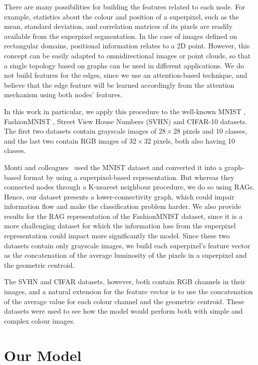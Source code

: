 \documentclass[twocolumn]{article}
\begin{document}
There are many possibilities for building the features related to each node. For example, statistics about the colour and position of a superpixel, such as the mean, standard deviation, and correlation matrices of its pixels are readily available from the superpixel segmentation. In the case of images defined on rectangular domains, positional information relates to a 2D point. However, this concept can be easily adapted to  omnidirectional images or point clouds, so that a single topology based on graphs can be used in different applications. We do not build features for the edges, since we use an attention-based technique, and believe that the edge feature will be learned accordingly from the attention mechanism using both nodes' features.

In this work in particular, we apply this procedure to the well-known MNIST \cite{lecun1998mnist}, FashionMNIST \cite{xiao2017fashionmnist}, Street View House Numbers (SVHN) \cite{netzer2011svhn} and CIFAR-10 \cite{krizhevsky2009cifar} datasets. The first two datasets contain grayscale images of $28 \times 28$ pixels and 10 classes, and the last two contain RGB images of $32 \times 32$ pixels, both also having 10 classes.

Monti and colleagues~\cite{monti2017monet} used the MNIST dataset and converted it into a graph-based format by using a superpixel-based representation. But whereas they connected nodes through a K-nearest neighbour procedure, we do so using RAGs. Hence, our dataset presents a lower-connectivity graph, which could impair information flow and make the classification problem harder. We also provide results for the RAG representation of the FashionMNIST dataset, since it is a more challenging dataset for which the information loss from the superpixel representation could impact more significantly the model. Since these two datasets contain only grayscale images, we build each superpixel's feature vector as the concatenation of the average luminosity of the pixels in a superpixel and the geometric centroid.

The SVHN and CIFAR datasets, however, both contain RGB channels in their images, and a natural extension for the feature vector is to use the concatenation of the average value for each colour channel and the geometric centroid. These datasets were used to see how the model would perform both with simple and complex colour images.

\section{Our Model}\label{sec:model}
\end{document}
